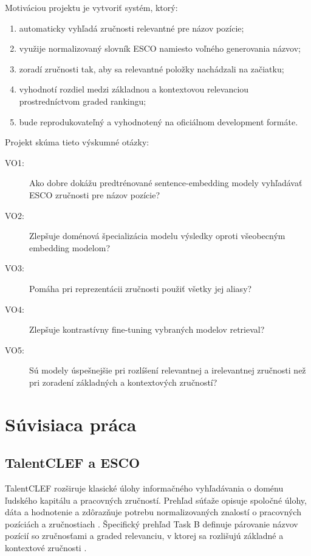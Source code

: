 \documentclass[12pt,a4paper]{article}
\begin{document}
Motiváciou projektu je vytvoriť systém, ktorý:
\begin{enumerate}[label=\arabic*.]
  \item automaticky vyhľadá zručnosti relevantné pre názov pozície;
  \item využije normalizovaný slovník ESCO namiesto voľného generovania názvov;
  \item zoradí zručnosti tak, aby sa relevantné položky nachádzali na začiatku;
  \item vyhodnotí rozdiel medzi základnou a kontextovou relevanciou
  prostredníctvom graded rankingu;
  \item bude reprodukovateľný a vyhodnotený na oficiálnom development formáte.
\end{enumerate}

Projekt skúma tieto výskumné otázky:
\begin{description}
  \item[VO1:] Ako dobre dokážu predtrénované sentence-embedding modely
  vyhľadávať ESCO zručnosti pre názov pozície?
  \item[VO2:] Zlepšuje doménová špecializácia modelu výsledky oproti
  všeobecným embedding modelom?
  \item[VO3:] Pomáha pri reprezentácii zručnosti použiť všetky jej aliasy?
  \item[VO4:] Zlepšuje kontrastívny fine-tuning vybraných modelov retrieval?
  \item[VO5:] Sú modely úspešnejšie pri rozlíšení relevantnej a irelevantnej
  zručnosti než pri zoradení základných a kontextových zručností?
\end{description}

\section{Súvisiaca práca}

\subsection{TalentCLEF a ESCO}

TalentCLEF rozširuje klasické úlohy informačného vyhľadávania o doménu
ľudského kapitálu a pracovných zručností. Prehľad súťaže opisuje spoločné
úlohy, dáta a hodnotenie a zdôrazňuje potrebu normalizovaných znalostí o
pracovných pozíciách a zručnostiach \parencite{gasco2026overview}.
Špecifický prehľad Task B definuje párovanie názvov pozícií so zručnosťami a
graded relevanciu, v ktorej sa rozlišujú základné a kontextové zručnosti
\parencite{talentclef2026overviewb}.
\end{document}
